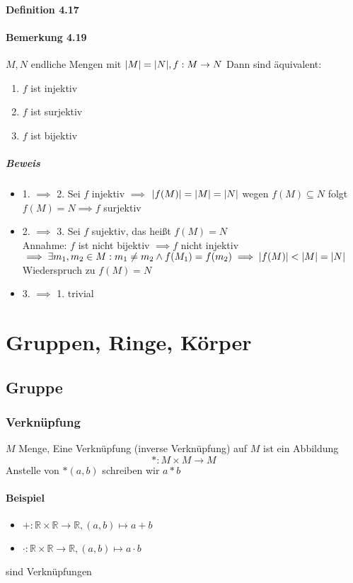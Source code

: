 \documentclass[a4paper]{scrartcl}
\DeclarePairedDelimiter\abs{\lvert}{\rvert}%
\theoremstyle{definition}
\theoremstyle{plain}
\theoremstyle{plain}
\theoremstyle{remark}
\theoremstyle{remark}
\theoremstyle{remark}
\theoremstyle{remark}
\theoremstyle{remark}
\begin{document}
\paragraph{Definition 4.17}
\label{sec-2-6-7-9}
\paragraph{Bemerkung 4.19}
\label{sec-2-6-7-10}
$M,N$ endliche Mengen mit $\abs{M} = \abs{N},f:M\to N$ Dann sind äquivalent:
\begin{enumerate}
\item $f$ ist injektiv
\item $f$ ist surjektiv
\item $f$ ist bijektiv
\end{enumerate}
\subparagraph{Beweis}
\label{sec-2-6-7-10-1}
\begin{itemize}
\item 1. $\implies$ 2. Sei $f$ injektiv $\implies$ $\abs{f(M)} = \abs{M} = \abs{N}$ wegen $f(M) \subseteq N$ folgt $f(M) = N \implies f$ surjektiv
\item 2. $\implies$ 3. Sei $f$ sujektiv, das heißt $f(M) = N$ \\
        Annahme: $f$ ist nicht bijektiv $\implies f$ nicht injektiv $\implies \exists m_1,m_2\in M: m_1\neq m_2 \wedge f(M_1) = f(m_2) \implies \abs{f(M)} < \abs{M} = \abs{N}$ Wiederspruch zu $f(M) = N$
\item 3. $\implies$ 1. trivial
\end{itemize}
\section{Gruppen, Ringe, Körper}
\label{sec-3}
\subsection{Gruppe}
\label{sec-3-1}
\subsubsection{Verknüpfung}
\label{sec-3-1-1}
$M$ Menge, Eine Verknüpfung (inverse Verknüpfung) auf $M$ ist ein Abbildung \[*:M\times M \to M\]
Anstelle von $*(a,b)$ schreiben wir $a * b$
\paragraph{Beispiel}
\label{sec-3-1-1-1}
\begin{itemize}
\item $+: \mathbb{R} \times \mathbb{R} \to \mathbb{R},(a,b) \mapsto a + b$
\item $\cdot: \mathbb{R} \times \mathbb{R} \to \mathbb{R},(a,b) \mapsto a\cdot b$
\end{itemize}
sind Verknüpfungen
\end{document}
